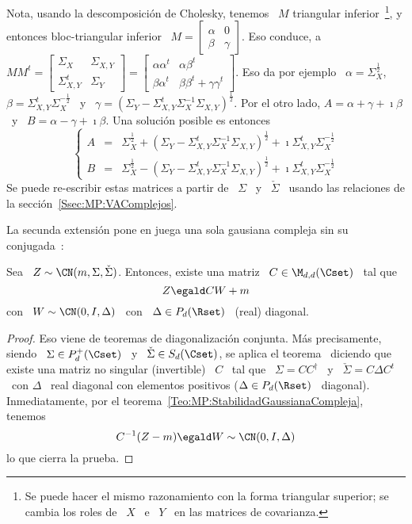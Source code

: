 %
Nota,  usando  la  descomposici\'on   de  Cholesky,  tenemos  \  $M$  triangular
inferior~\footnote{Se puede hacer el  mismo razonamiento con la forma triangular
  superior;  se cambia  los roles  de \  $X$  \ e  \ $Y$  \ en  las matrices  de
  covarianza.},  y  entonces bloc-triangular  inferior  \  $M =  \begin{bmatrix}
  \alpha  &  0  \\  \beta  &  \gamma \end{bmatrix}$.   Eso  conduce,  a  $M  M^t
= \begin{bmatrix} \Sigma_X & \Sigma_{X,Y} \\ \Sigma_{X,Y}^t &
  \Sigma_Y \end{bmatrix}  = \begin{bmatrix} \alpha \alpha^t &  \alpha \beta^t \\
  \beta \alpha^t &  \beta \beta^t + \gamma \gamma^t  \end{bmatrix}$.  Eso da por
ejemplo \   $\alpha    =   \Sigma_X^{\frac12}$,    \    $\beta   =    \Sigma_{X,Y}^t
\Sigma_X^{-\frac12}$ \ y \ $\gamma = \left( \Sigma_Y - \Sigma_{X,Y}^t \Sigma_X^{-1}
  \Sigma_{X,Y} \right)^{\frac12}$.   Por el otro lado,  $A = \alpha  + \gamma +
\imath \beta$ \ y \ $B = \alpha - \gamma + \imath \beta$. Una soluci\'on posible
es entonces
%
\[
\left\{\begin{array}{lll}
A & = & \Sigma_X^{\frac12} + \left( \Sigma_Y - \Sigma_{X,Y}^t \Sigma_X^{-1} \Sigma_{X,Y}
\right)^{\frac12}  + \imath \Sigma_{X,Y}^t
\Sigma_X^{-\frac12}\\[2.5mm]
%
B & = &  \Sigma_X^{\frac12} - \left( \Sigma_Y - \Sigma_{X,Y}^t \Sigma_X^{-1} \Sigma_{X,Y}
\right)^{\frac12} + \imath \Sigma_{X,Y}^t
\Sigma_X^{-\frac12}
\end{array}\right.
\]
%
Se  puede   re-escribir  estas  matrices   a  partir  de   \  $\Sigma$  \   y  \
$\check{\Sigma}$       \      usando       las       relaciones      de       la
secci\'on~\ref{Ssec:MP:VAComplejos}.

La  secunda  extensi\'on  pone  en  juega  una sola  gausiana  compleja  sin  su
conjugada~\cite{EriKoi06, SchSch03}:
%
\begin{teorema}
\label{Teo:MP:GausianaComplejaWIDiago}
%
  Sea \ $Z \sim \CN(m,\Sigma,\check{\Sigma})$. Entonces, existe una matriz \ $C
  \in \M_{d,d}(\Cset)$ \ tal que
  \[
  Z \egald C W + m
  \]
  con \ $W \sim \CN(0,I,\Delta)$ \ con \ $\Delta \in P_d(\Rset)$ \ (real) diagonal.
\end{teorema}
\begin{proof}
  Eso  viene  de teoremas  de  diagonalizaci\'on  conjunta. M\'as  precisamente,
  siendo \ $\Sigma  \in P_d^+(\Cset)$ \ y \  $\check{\Sigma} \in S_d(\Cset)$, se
  aplica el  teorema~\cite[Teo.~7.6.5]{HorJoh13} diciendo que  existe una matriz
  no  singular (invertible)  \  $C$ \  tal  que \  $\Sigma  = C  C^\dag$  \ y  \
  $\check{\Sigma} = C  \Delta C^t$ \ con $\Delta$ \  real diagonal con elementos
  positivos  ($\Delta  \in  P_d(\Rset)$  \  diagonal).  Inmediatamente,  por  el
  teorema~\ref{Teo:MP:StabilidadGaussianaCompleja}, tenemos
  \[
  C^{-1} (Z - m) \egald W \sim \CN(0,I,\Delta)
  \]
  lo que cierra la prueba.
\end{proof}



